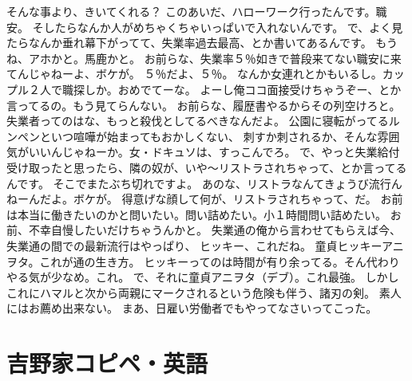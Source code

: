 \documentclass[14pt,a4paper]{ltjsarticle}
\begin{document}
そんな事より、きいてくれる？ 
このあいだ、ハローワーク行ったんです。職安。 
そしたらなんか人がめちゃくちゃいっぱいで入れないんです。 
で、よく見たらなんか垂れ幕下がってて、失業率過去最高、とか書いてあるんです。 
もうね、アホかと。馬鹿かと。 
お前らな、失業率５％如きで普段来てない職安に来てんじゃねーよ、ボケが。 
５％だよ、５％。 
なんか女連れとかもいるし。カップル２人で職探しか。おめでてーな。 
よーし俺ココ面接受けちゃうぞー、とか言ってるの。もう見てらんない。 
お前らな、履歴書やるからその列空けろと。 
失業者ってのはな、もっと殺伐としてるべきなんだよ。 
公園に寝転がってるルンペンといつ喧嘩が始まってもおかしくない、 
刺すか刺されるか、そんな雰囲気がいいんじゃねーか。女・ドキュソは、すっこんでろ。 
で、やっと失業給付受け取ったと思ったら、隣の奴が、いや～リストラされちゃって、とか言ってるんです。 
そこでまたぶち切れですよ。 
あのな、リストラなんてきょうび流行んねーんだよ。ボケが。 
得意げな顔して何が、リストラされちゃって、だ。 
お前は本当に働きたいのかと問いたい。問い詰めたい。小１時間問い詰めたい。 
お前、不幸自慢したいだけちゃうんかと。 
失業通の俺から言わせてもらえば今、失業通の間での最新流行はやっぱり、 
ヒッキー、これだね。 
童貞ヒッキーアニヲタ。これが通の生き方。 
ヒッキーってのは時間が有り余ってる。そん代わりやる気が少なめ。これ。 
で、それに童貞アニヲタ（デブ）。これ最強。 
しかしこれにハマルと次から両親にマークされるという危険も伴う、諸刃の剣。 
素人にはお薦め出来ない。 
まあ、日雇い労働者でもやってなさいってこった。 

\section{吉野家コピペ・英語}
\end{document}
